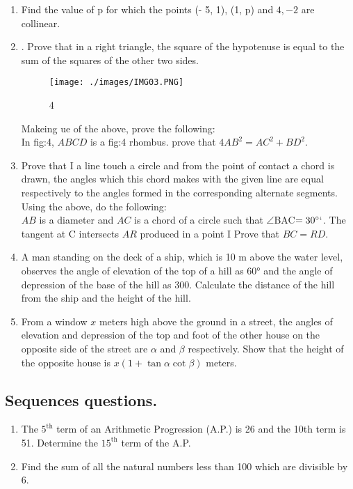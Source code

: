\documentclass{article}
\begin{document}
\begin{enumerate}
\item Find the value of p for which the points (- 5, 1), (1, p) and \(4, - 2\) are collinear.
\item . Prove that in a right triangle, the square of the hypotenuse is equal to the sum of the
squares of the other two sides.
\begin{figure}[H]
        \centering
          \texttt{[image: ./images/IMG03.PNG]}
          \caption{4}                                                                                                                                             \label{fig:}

 \end{figure}

Makeing  ue  of the above, prove the following:\\
In fig:4, $ABCD$ is a fig:4 rhombus. prove that $4AB^2 =  AC^2 +BD^2$.


\item Prove that I a line touch a circle and from the point of contact a chord is drawn, the angles
which this chord makes with the given line are equal respectively to the angles formed in the
corresponding alternate segments.
Using the above, do the following: \\
$AB$ is a diameter and $AC$ is a chord of a circle such that $\angle $BAC$ = 30\degree`$. The tangent at C
intersects $AR$ produced in a point I Prove that $BC = RD.$

\item A man standing on the deck of a ship, which is 10 m above the water level, observes the
angle of elevation of the top of a hill as 60° and the angle of depression of the base of the hill as
300. Calculate the distance of the hill from the ship and the height of the hill.

\item From a window $x$ meters high above the ground in a street, the angles of elevation and depression of the top and foot of the other house on the opposite side of the street are $\alpha$ and $\beta$ respectively. Show that the height of the opposite house is $x(1 + \tan \alpha \cot \beta)$ meters.






\end{enumerate}
\subsection{Sequences questions.}

\begin{enumerate}
    \item The $5^{\text{th}}$ term of an Arithmetic Progression (A.P.) is 26 and the 10th term is 51. Determine the $15^{\text{th}}$ term of the A.P.
    \item Find the sum of all the natural numbers less than 100 which are divisible by 6.
\end{enumerate}
\end{document}
